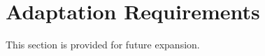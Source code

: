 \KNEADSECTIONNEWPAGE
\section{Adaptation Requirements}
\label{lab:sec_Adaptation}


This section is provided for future expansion.